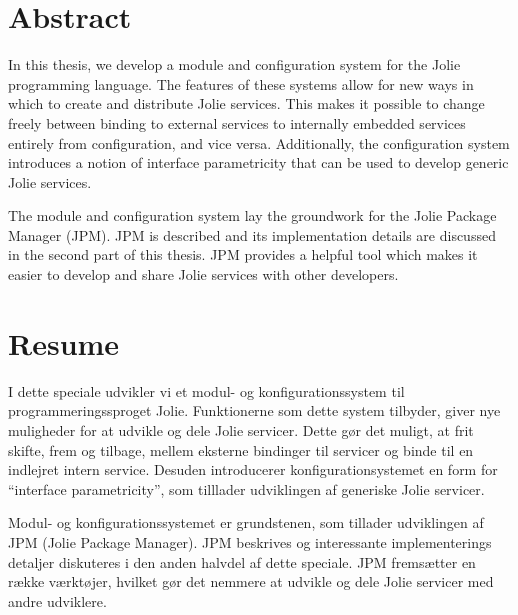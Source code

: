 \pagestyle{empty}
\vspace*{\fill}%

\section*{Abstract}

In this thesis, we develop a module and configuration system for the Jolie
programming language. The features of these systems allow for new ways in which
to create and distribute Jolie services. This makes it possible to change
freely between binding to external services to internally embedded services
entirely from configuration, and vice versa. Additionally, the configuration
system introduces a notion of interface parametricity that can be used to
develop generic Jolie services.

The module and configuration system lay the groundwork for the Jolie Package
Manager (JPM). JPM is described and its implementation details are discussed in
the second part of this thesis. JPM provides a helpful tool which makes it
easier to develop and share Jolie services with other developers.

\section*{Resume}

I dette speciale udvikler vi et modul- og konfigurationssystem til
programmeringssproget Jolie. Funktionerne som dette system tilbyder, giver nye
muligheder for at udvikle og dele Jolie servicer. Dette gør det muligt, at frit
skifte, frem og tilbage, mellem eksterne bindinger til servicer og binde til en
indlejret intern service. Desuden introducerer konfigurationsystemet en form
for ``interface parametricity'', som tilllader udviklingen af generiske Jolie
servicer.

Modul- og konfigurationssystemet er grundstenen, som tillader udviklingen af
JPM (Jolie Package Manager). JPM beskrives og interessante implementerings
detaljer diskuteres i den anden halvdel af dette speciale. JPM fremsætter en
række værktøjer, hvilket gør det nemmere at udvikle og dele Jolie servicer med
andre udviklere.

\vspace*{\fill}%
